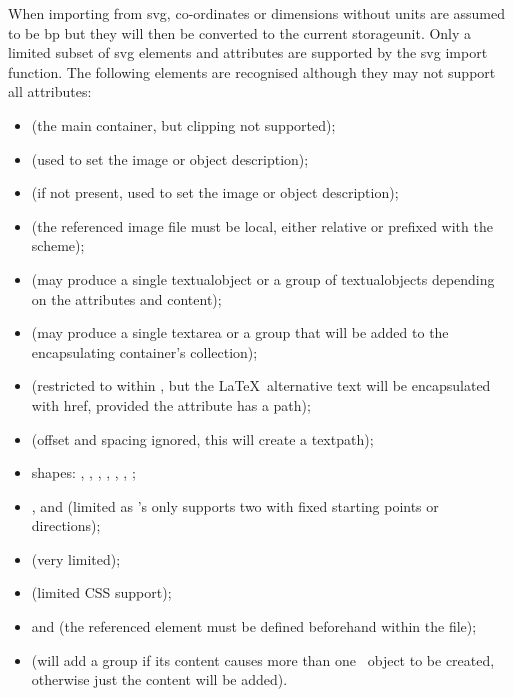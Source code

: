 When importing from \gls{svg}, \glspl{co-ordinate} or dimensions without
units are assumed to be \gls{bp} but they will then be converted to the
current \gls{storageunit}.  Only a limited subset of \gls{svg}
elements and attributes are supported by the \gls{svg} import
function. The following elements are recognised although they may
not support all attributes:
\begin{itemize}
\item {} (the main container, but clipping not supported);
\item {} (used to set the image or object description);
\item {} (if  not present, used to set
the image or object description);
\item {} (the referenced image file must be
local, either relative or prefixed with the  scheme);
\item {} (may produce a single \gls{textualobject} or a
\gls{group} of \glspl{textualobject} depending on the attributes and
content);
\item {} (may produce a single \gls{textarea} or a
\gls{group} that will be added to the encapsulating 
container's collection);
\item {} (restricted to within , but the
\LaTeX\ alternative text will be encapsulated with \gls{href},
provided the  attribute has a path);
\item {} (offset and spacing ignored, this will
create a \gls{textpath});
\item shapes: , ,
, , ,
, ;
\item {},  and 
(limited as \FlowframTk's  only supports two
 with fixed starting points or directions);
\item {} (very limited);
\item {} (limited CSS support);
\item {} and  (the referenced element must be
defined beforehand within the file);
\item {} (will add a \gls{group} if its content causes more
than one \FlowframTk\ \gls{object} to be created, otherwise just the
content will be added).
\end{itemize}


